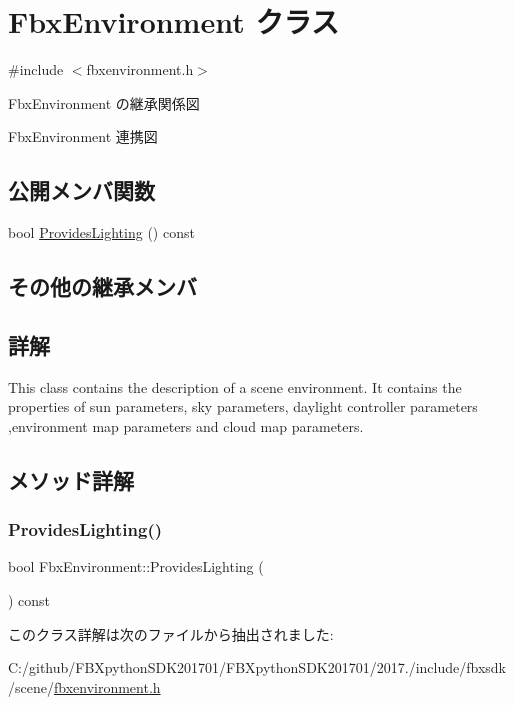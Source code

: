 \hypertarget{class_fbx_environment}{}\section{Fbx\+Environment クラス}
\label{class_fbx_environment}


{\ttfamily \#include $<$fbxenvironment.\+h$>$}



Fbx\+Environment の継承関係図


Fbx\+Environment 連携図
\subsection*{公開メンバ関数}
\begin{DoxyCompactItemize}
\item 
bool \hyperlink{class_fbx_environment_a5665a3c24b1b886fb8e00cc4db1fef14}{Provides\+Lighting} () const
\end{DoxyCompactItemize}
\subsection*{その他の継承メンバ}


\subsection{詳解}
This class contains the description of a scene environment. It contains the properties of sun parameters, sky parameters, daylight controller parameters ,environment map parameters and cloud map parameters. 

\subsection{メソッド詳解}
\mbox{\label{class_fbx_environment_a5665a3c24b1b886fb8e00cc4db1fef14}} 
\subsubsection{\texorpdfstring{Provides\+Lighting()}{ProvidesLighting()}}
{\footnotesize\ttfamily bool Fbx\+Environment\+::\+Provides\+Lighting (\begin{DoxyParamCaption}{ }\end{DoxyParamCaption}) const}



このクラス詳解は次のファイルから抽出されました\+:\begin{DoxyCompactItemize}
\item 
C\+:/github/\+F\+B\+Xpython\+S\+D\+K201701/\+F\+B\+Xpython\+S\+D\+K201701/2017./include/fbxsdk/scene/\hyperlink{fbxenvironment_8h}{fbxenvironment.\+h}\end{DoxyCompactItemize}
